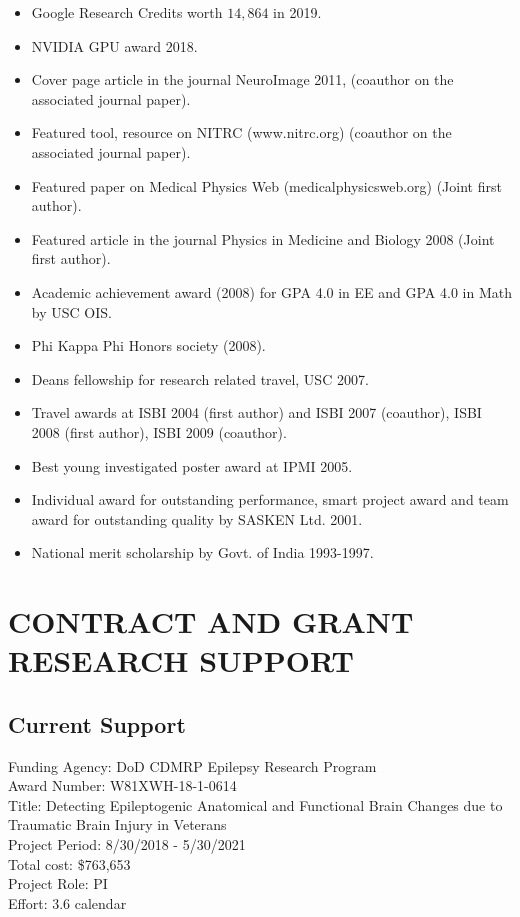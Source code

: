 \documentclass[overlapped,line,letterpaper]{res}
\begin{document}
\begin{resume}
\begin{itemize}
\item Google Research Credits worth $14,864$ in 2019.
\item NVIDIA GPU award 2018.
\item Cover page article in the journal NeuroImage 2011, (coauthor on the associated journal paper).
\item Featured tool, resource on NITRC (www.nitrc.org) (coauthor on the associated journal paper).
\item Featured paper on Medical Physics Web (medicalphysicsweb.org) (Joint first author). 
\item Featured article in the journal Physics in Medicine and Biology 2008 (Joint first author).
\item Academic achievement award (2008) for GPA 4.0 in EE and GPA 4.0 in Math by USC OIS.
\item Phi Kappa Phi Honors society (2008).
\item Deans fellowship for research related travel, USC 2007.
\item Travel awards at ISBI 2004 (first author) and ISBI 2007 (coauthor), ISBI 2008 (first author), ISBI 2009 (coauthor).
\item Best young investigated poster award at IPMI 2005.
\item Individual award for outstanding performance, smart project award and team award for outstanding quality by SASKEN Ltd. 2001.
\item National merit scholarship by Govt. of India 1993-1997.
\end{itemize}

\section{CONTRACT AND GRANT RESEARCH SUPPORT}

\subsection{Current Support}
Funding Agency: DoD CDMRP Epilepsy Research Program \\
Award Number: W81XWH-18-1-0614 \\
Title: Detecting Epileptogenic Anatomical and Functional Brain Changes
due to Traumatic Brain Injury in Veterans \\
Project Period: 8/30/2018 - 5/30/2021\\
Total cost: \$763,653\\
Project Role: PI\\
Effort: 3.6 calendar\\



\end{resume}
\end{document}
